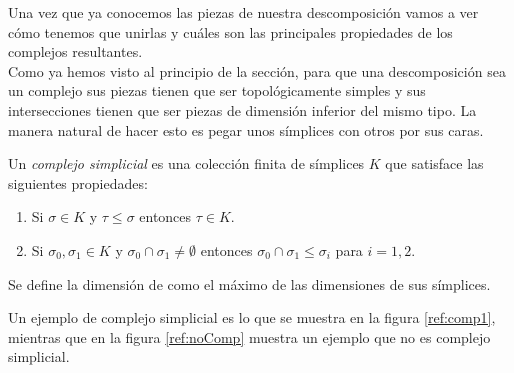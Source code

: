 Una vez que ya conocemos las piezas de nuestra descomposición vamos a ver cómo tenemos que unirlas y cuáles son las principales propiedades de los complejos resultantes.\\
Como ya hemos visto al principio de la sección, para que una descomposición sea un complejo sus piezas tienen que ser topológicamente simples y sus intersecciones tienen que ser piezas de dimensión inferior del mismo tipo. La manera natural de hacer esto es pegar unos símplices con otros por sus caras.

\begin{definition}
Un \emph{complejo simplicial} es una colección finita de símplices $K$ que satisface las siguientes propiedades:
\begin{enumerate}
	\item Si $\sigma \in K$ y $\tau \leq \sigma$ entonces $\tau \in K$.
	\item Si $\sigma_0,\sigma_1 \in K$ y $\sigma_0 \cap \sigma_1 \neq \emptyset$ entonces $\sigma_0 \cap \sigma_1 \leq \sigma_i$ para $i = 1,2$.
\end{enumerate}
\end{definition}

Se define la dimensión de como el máximo de las dimensiones de sus símplices.

Un ejemplo de complejo simplicial es lo que se muestra en la figura \ref{ref:comp1}, mientras que en la figura \ref{ref:noComp} muestra un ejemplo que no es complejo simplicial.


